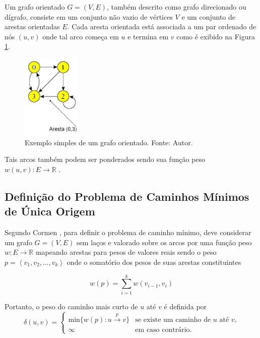 \documentclass[12pt]{article}
\begin{document}
Um grafo orientado $G=(V,E)$, também descrito como grafo direcionado ou dígrafo, consiste em um conjunto não vazio de vértices $V$ e um conjunto de arestas orientadas $E$. Cada aresta orientada está associada a um par ordenado de nós $(u, v)$ onde tal arco começa em $u$ e termina em $v$ como é exibido na Figura \ref{fig:orientado}.

\begin{figure}[H]
  \centering
    \includegraphics[width=0.25\textwidth]{img/ponderado.jpg}
  \caption{Exemplo simples de um grafo orientado. Fonte: Autor.}
  \label{fig:orientado}
\end{figure}

Tais arcos também podem ser ponderados sendo sua função peso $w(u, v) : E \rightarrow \mathbb{R}$ \cite{netto2003grafos}.


    
\subsection{Definição do Problema de Caminhos Mínimos de Única Origem} \label{sec:1todos}

	Segundo Cormen \cite{cormen2002algoritmos}, para definir o problema de caminho mínimo, deve considerar um grafo $G = (V, E)$ sem laços e valorado sobre os arcos por uma função peso $w : E \rightarrow \mathbb{R}$ mapeando arestas para pesos de valores reais sendo o peso $p = \left \langle v_{1}, v_{2}, \ldots, v_{k}  \right \rangle$ onde o somatório dos pesos de suas arestas constituintes 
    
    $$w(p) = \sum_{i=1}^{k} w(v_{i-1}, v_{i})$$
   
Portanto, o peso do caminho mais curto de $u$ até $v$ é definida por 
$$
	\delta(u, v) = 
	\begin{cases}
		\text{min}\{w(p):u\xrightarrow{p} v\} & \text{se existe um caminho de } u \text{ até } v\text{,}\\
		\infty & \text{em caso contrário.}
	\end{cases}
$$
\end{document}
